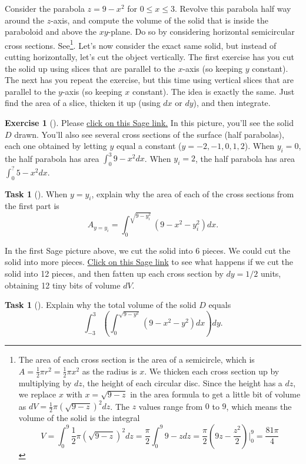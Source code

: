 \documentclass[10pt,]{book}
\theoremstyle{plain}
\theoremstyle{definition}
\theoremstyle{definition}
\theoremstyle{definition}
\theoremstyle{definition}
\newtheorem{exploration}[project]{Exercise}
\newtheorem{task}[project]{Task}
\theoremstyle{definition}
\numberwithin{equation}{section}
\newcommand{\ds}{\displaystyle}
\begin{document}
Consider the parabola \(z=9-x^2\) for \(0\leq x\leq 3\). Revolve this parabola half way around the \(z\)-axis, and compute the volume of the solid that is inside the paraboloid and above the \(xy\)-plane. Do so by considering horizontal semicircular cross sections. See\footnote{The area of each cross section is the area of a semicircle, which is \(A=\frac{1}{2}\pi r^2 = \frac12 \pi x^2\) as the radius is \(x\). We thicken each cross section up by multiplying by \(dz\), the height of each circular disc. Since the height has a \(dz\), we replace \(x\) with \(x=\sqrt{9-z}\) in the area formula to get a little bit of volume as \(dV = \frac{1}{2}\pi (\sqrt{9-z})^2 dz\).  The \(z\) values range from \(0\) to \(9\), which means the volume of the solid is the integral%
\begin{equation*}
V
=\int_0^9 \frac{1}{2}\pi (\sqrt{9-z})^2 dz
=\frac{\pi}{2}\int_0^9  9-z dz
=\frac{\pi}{2}  \left(9z-\frac{z^2}{2}\right)\bigg|_0^9
=\frac{81\pi}{4}
\end{equation*}
\label{fn-23}}.%
Let's now consider the exact same solid, but instead of cutting horizontally, let's cut the object vertically. The first exercise has you cut the solid up using slices that are parallel to the \(x\)-axis (so keeping \(y\) constant). The next has you repeat the exercise, but this time using vertical slices that are parallel to the \(y\)-axis (so keeping \(x\) constant). The idea is exactly the same. Just find the area of a slice, thicken it up (using \(dx\) or \(dy\)), and then integrate.%
\begin{exploration}[]\label{prob_double-int_half_parabolic}
Please \href{http://bmw.byuimath.com/dokuwiki/doku.php?id=cross_sections_of_solid_by_letting_y_equal_a_constant}{click on this Sage link.} In this picture, you'll see the solid \(D\) drawn. You'll also see several cross sections of the surface (half parabolas), each one obtained by letting \(y\) equal a constant (\(y=-2, -1,0,1,2\)). When \(y_i=0\), the half parabola has area \(\int_0^3 9-x^2dx\). When \(y_i=2\), the half parabola has area \(\int_0^? 5-x^2dx\).%
\begin{task}[]\label{task-666}
When \(y=y_i\), explain why the area of each of the cross sections from the first part is%
\begin{equation*}
A_{y=y_i}=\ds \int_0^{\sqrt{9-y_i^2}} (9-x^2-y_i^2) dx.
\end{equation*}
%
\end{task}
In the first Sage picture above, we cut the solid into 6 pieces. We could cut the solid into more pieces. \href{http://bmw.byuimath.com/dokuwiki/doku.php?id=cross_sections_multiplied_by_dy}{Click on this Sage link} to see what happens if we cut the solid into 12 pieces, and then fatten up each cross section by \(dy=1/2\) units, obtaining 12 tiny bits of volume \(dV\).%
\begin{task}[]\label{task-667}
Explain why the total volume of the solid \(D\) equals%
\begin{equation*}
\ds\int_{-3}^{3} \left(\int_0^{\sqrt{9-y^2}}(9-x^2-y^2) dx\right) dy.
\end{equation*}
%
\end{task}
\end{exploration}
\end{document}
